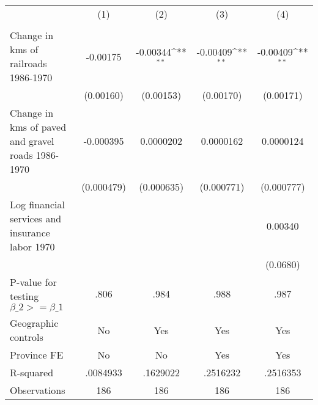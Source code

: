 {
\def\sym#1{\ifmmode^{#1}\else\(^{#1}\)\fi}
\begin{tabular}{l*{4}{c}}
\hline\hline
                &\multicolumn{1}{c}{(1)}&\multicolumn{1}{c}{(2)}&\multicolumn{1}{c}{(3)}&\multicolumn{1}{c}{(4)}\\
                &\multicolumn{1}{c}{}&\multicolumn{1}{c}{}&\multicolumn{1}{c}{}&\multicolumn{1}{c}{}\\
\hline
Change in kms of railroads 1986-1970& -0.00175         & -0.00344\sym{**} & -0.00409\sym{**} & -0.00409\sym{**} \\
                &(0.00160)         &(0.00153)         &(0.00170)         &(0.00171)         \\
[1em]
Change in kms of paved and gravel roads 1986-1970&-0.000395         &0.0000202         &0.0000162         &0.0000124         \\
                &(0.000479)         &(0.000635)         &(0.000771)         &(0.000777)         \\
[1em]
Log financial services and insurance labor 1970&                  &                  &                  &  0.00340         \\
                &                  &                  &                  & (0.0680)         \\
\hline
P-value for testing $\beta\_{2} >= \beta\_{1}$&     .806         &     .984         &     .988         &     .987         \\
Geographic controls&       No         &      Yes         &      Yes         &      Yes         \\
Province FE     &       No         &       No         &      Yes         &      Yes         \\
R-squared       & .0084933         & .1629022         & .2516232         & .2516353         \\
Observations    &      186         &      186         &      186         &      186         \\
\hline\hline
\end{tabular}
}
